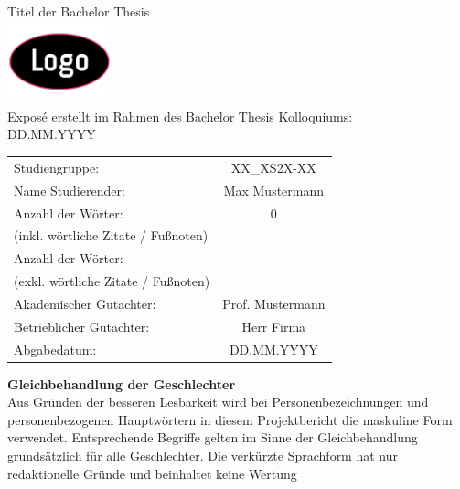 \documentclass[a4paper,12pt]{scrartcl}
\newcommand{\documentTitle}[1]{{\fontsize{20pt}{24pt}\selectfont\color{ba-blau}#1}}
\newcommand{\pageTitle}[1]{{\fontsize{14pt}{17pt}\selectfont\textbf{\color{ba-blau}#1}}}
\begin{document}
\thispagestyle{Deckblatt}

\begin{center}
    \documentTitle {Titel der Bachelor Thesis} \\[3ex]
    \includegraphics[width=3cm]{Platzhalter_logo.png} \\[3ex]
    \large{Exposé erstellt im Rahmen des Bachelor Thesis Kolloquiums:
} \\
    \large{DD.MM.YYYY}
\end{center}

\renewcommand{\arraystretch}{2.5}
\begin{table}[h]
    \centering
    \begin{tabularx}{\textwidth}{l c}
        Studiengruppe: &  XX\_XS2X-XX \\
        Name Studierender: & Max Mustermann\\
        Anzahl der Wörter: & 0\\
        (inkl. wörtliche Zitate / Fußnoten) & ~ \\
        Anzahl der Wörter: & \\
        (exkl. wörtliche Zitate / Fußnoten) & ~ \\
        Akademischer Gutachter: & Prof. Mustermann\\
        Betrieblicher Gutachter: & Herr Firma\\
        Abgabedatum: & DD.MM.YYYY\\
    \end{tabularx}
\end{table}

\newpage

\pagestyle{defaultPageStyle}

\pageTitle{Gleichbehandlung der Geschlechter}\\
Aus Gründen der besseren Lesbarkeit wird bei Personenbezeichnungen und personenbezogenen Hauptwörtern in diesem Projektbericht die maskuline Form verwendet. Entsprechende Begriffe gelten im Sinne der Gleichbehandlung grundsätzlich für alle Geschlechter. Die verkürzte Sprachform hat nur redaktionelle Gründe und beinhaltet keine Wertung
\newpage
\end{document}
